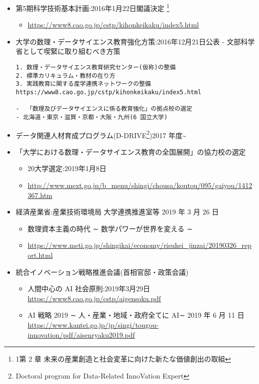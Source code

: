 \documentclass[
]{bxjsbook}
\providecommand{\tightlist}{%
  \setlength{\itemsep}{0pt}\setlength{\parskip}{0pt}}
\theoremstyle{definition}
\theoremstyle{definition}
\theoremstyle{definition}
\theoremstyle{definition}
\theoremstyle{remark}
\begin{document}
\begin{itemize}
\item
  第5期科学技術基本計画:2016年1月22日閣議決定 \footnote{1第 2 章 未来の産業創造と社会変革に向けた新たな価値創出の取組}

  \begin{itemize}
  \tightlist
  \item
    \url{https://www8.cao.go.jp/cstp/kihonkeikaku/index5.html}
  \end{itemize}
\item
  大学の数理・データサイエンス教育強化方策:2016年12月21日公表
  - 文部科学省として喫緊に取り組むべき方策

\begin{verbatim}
1. 数理・データサイエンス教育研究センター(仮称)の整備
2. 標準カリキュラム・教材の在り方
3. 実践教育に関する産学連携ネットワークの整備         
https://www8.cao.go.jp/cstp/kihonkeikaku/index5.html

-  「数理及びデータサイエンスに係る教育強化」の拠点校の選定 
- 北海道・東京・滋賀・京都・大阪・九州(6 国立大学)
\end{verbatim}
\item
  データ関連人材育成プログラム(D-DRIVE\footnote{Doctoral program for Data-Related InnoVation Expert})2017 年度\textasciitilde{}
\item
  「大学における数理・データサイエンス教育の全国展開」の協力校の選定

  \begin{itemize}
  \tightlist
  \item
    20大学選定:2019年1月8日
  \item
    \url{http://www.mext.go.jp/b_menu/shingi/chousa/koutou/095/gaiyou/1412367.htm}
  \end{itemize}
\item
  経済産業省:産業技術環境局 大学連携推進室等 2019 年 3 月 26 日

  \begin{itemize}
  \item
    数理資本主義の時代 ∼ 数学パワーが世界を変える ∼
  \item
    \url{https://www.meti.go.jp/shingikai/economy/risukei_jinzai/20190326_report.html}
  \end{itemize}
\item
  統合イノベーション戦略推進会議(首相官邸・政策会議)

  \begin{itemize}
  \tightlist
  \item
    人間中心の AI 社会原則:2019年3月29日
    \url{https://www8.cao.go.jp/cstp/aigensoku.pdf}
  \item
    AI 戦略 2019 ∼ 人・産業・地域・政府全てに AI∼ 2019 年 6 月 11 日 \url{https://www.kantei.go.jp/jp/singi/tougou-innovation/pdf/aisenryaku2019.pdf}
  \end{itemize}
\end{itemize}
\end{document}

